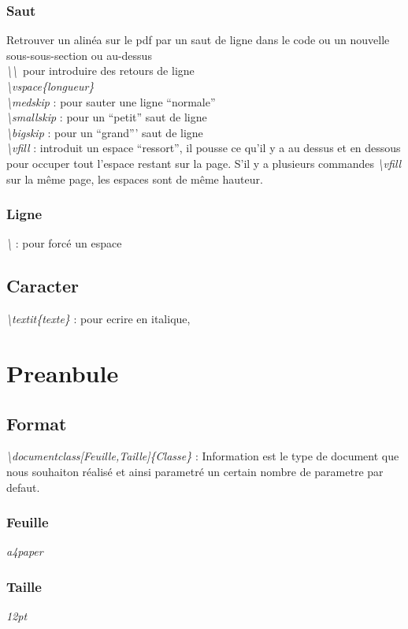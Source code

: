 \documentclass[a4paper,12pt]{report}
\begin{document}
			\subsubsection{Saut}
				Retrouver un alinéa sur le pdf par un saut de ligne dans le code ou un nouvelle sous-sous-section ou au-dessus\\
				\textit{\textbackslash\textbackslash}\ pour introduire des retours de ligne\\
				\textit{\textbackslash vspace\{longueur\}}\\
				\textit{\textbackslash medskip} : pour sauter une ligne \enquote{normale}\\
				\textit{\textbackslash smallskip} : pour un \enquote{petit} saut de ligne\\
				\textit{\textbackslash bigskip} : pour un \enquote{grand}' saut de ligne\\
				\textit{\textbackslash vfill} : introduit un espace \enquote{ressort}, il pousse ce qu'il y a au dessus et en dessous pour occuper tout l'espace restant sur la page. S'il y a plusieurs commandes \textit{\textbackslash vfill} sur la même page, les espaces sont de même hauteur.
			\subsubsection{Ligne}
				\textit{\textbackslash } : pour forcé un espace
		\subsection{Caracter}
			\textit{\textbackslash textit\{texte\}} : pour ecrire en italique,\\
	\section{Preanbule}
		\subsection{Format}
		\textit{\textbackslash documentclass[Feuille,Taille]\{Classe\}} : Information est le type de document que nous souhaiton réalisé et ainsi parametré un certain nombre de parametre par defaut.
			\subsubsection{Feuille}
				\textit{a4paper}
			\subsubsection{Taille}
				\textit{12pt}
\end{document}
